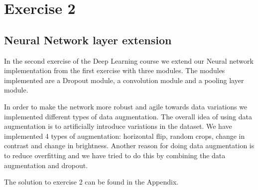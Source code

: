 \graphicspath{{Chapters/Exercise2/}}

\chapter{Exercise 2}

\section{Neural Network layer extension} %
\label{sec:Neural_Network_layer_extension}

In the second exercise of the Deep Learning course we extend our Neural
network implementation from the first exercise with three modules. The modules
implemented are a Dropout module, a convolution module and a pooling layer
module. 

In order to make the network more robust and agile towards data variations we
implemented different types of data augmentation. The overall idea of using data
augmentation is to artificially introduce variations in the dataset. We have
implemented 4 types of augmentation: horizontal flip, random crops, change in
contrast and change in brightness. Another reason for doing data augmentation
is to reduce overfitting and we have tried to do this by combining the data
augmentation and dropout. 


The solution to exercise 2 can be found in the Appendix. 
 


